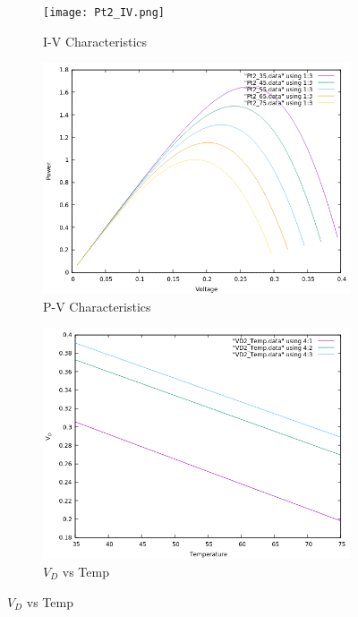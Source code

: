 \documentclass[12pt]{article}
\begin{document}
\begin{figure}[H]
	\begin{subfigure}[b]{0.6\linewidth}
	   	\texttt{[image: Pt2\_IV.png]}
		\caption{I-V Characteristics}
	\end{subfigure}
	\begin{subfigure}[b]{0.6\linewidth}
		\includegraphics[width = \linewidth, trim = {0 0 0 0}, clip]{Pt2_PV.png}
		\caption{P-V Characteristics}
	\end{subfigure} 
	\begin{subfigure}[b]{0.6\linewidth}
	   	\includegraphics[width = \linewidth, trim = {0 0 0 0}, clip]{Pt2_VDTemp.png}
		\caption{\( V_D \) vs Temp}
	\end{subfigure}

\end{figure}
\end{document}
